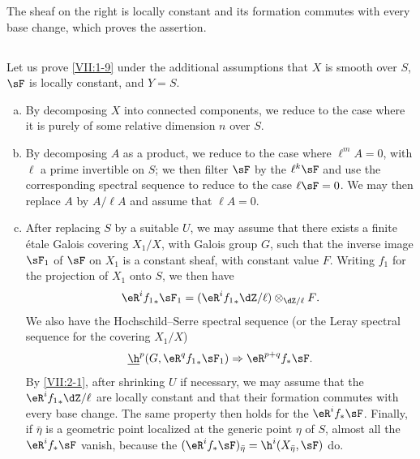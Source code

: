 The sheaf on the right is locally constant and its formation commutes with
every base change, which proves the assertion.





\subsection{}\label{VII:2-2}

Let us prove \ref{VII:1-9} under the additional assumptions that $X$ is smooth
over $S$, $\sF$ is locally constant, and $Y=S$.
\begin{enumerate}[a)]
  \item By decomposing $X$ into connected components, we reduce to the case
    where it is purely of some relative dimension $n$ over $S$.
  \item By decomposing $A$ as a product, we reduce to the case where
    $\ell^m A=0$, with $\ell$ a prime invertible on $S$; we then filter $\sF$
    by the $\ell^k \sF$ and use the corresponding spectral sequence to reduce
    to the case $\ell\sF=0$. We may then replace $A$ by $A/\ell A$ and assume
    that $\ell A=0$.
  \item {}After replacing $S$ by a suitable $U$, we may assume that there exists
    a finite étale Galois covering $X_1/X$, with Galois group $G$, such that
    the inverse image $\sF_1$ of $\sF$ on $X_1$ is a constant sheaf, with
    constant value $F$. Writing $f_1$ for the projection of $X_1$ onto $S$,
    we then have
    \[
      \eR^i {f_1}_\ast \sF_1 = (\eR^i {f_1}_\ast \dZ/\ell)\otimes_{\dZ/\ell} F \text{.} 
    \]
    We also have the Hochschild--Serre spectral sequence (or the Leray
    spectral sequence for the covering $X_1/X$)
    \[
      \underline\h^p(G,\eR^q {f_1}_\ast \sF_1) \Rightarrow \eR^{p+q} f_\ast \sF \text{.} 
    \]
    By \ref{VII:2-1}, after shrinking $U$ if necessary, we may assume that
    the $\eR^i {f_1}_\ast \dZ/\ell$ are locally constant and that their
    formation commutes with every base change. The same property then holds
    for the $\eR^i f_\ast \sF$. Finally, if $\bar\eta$ is a geometric point
    localized at the generic point $\eta$ of $S$, almost all the
    $\eR^i f_\ast\sF$ vanish, because the
    $(\eR^i f_\ast \sF)_{\bar\eta} = \h^i(X_{\bar \eta},\sF)$ do.
\end{enumerate}





\subsection{}\label{VII:2-3}

